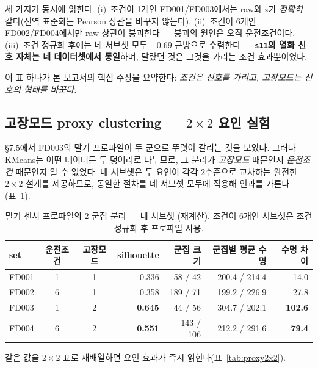 \documentclass[11pt]{article}
\begin{document}
세 가지가 동시에 읽힌다.
(i)~조건이 1개인 FD001/FD003에서는 raw와 z가 \emph{정확히} 같다(전역 표준화는 Pearson 상관을 바꾸지 않는다).
(ii)~조건이 6개인 FD002/FD004에서만 raw 상관이 붕괴한다 — 붕괴의 원인은 오직 운전조건이다.
(iii)~조건 정규화 후에는 네 서브셋 모두 $-0.69$ 근방으로 수렴한다 — \textbf{\texttt{s11}의 열화 신호 자체는 네 데이터셋에서 동일}하며, 달랐던 것은 그것을 가리는 조건 효과뿐이었다.

이 표 하나가 본 보고서의 핵심 주장을 요약한다: \emph{조건은 신호를 가리고, 고장모드는 신호의 형태를 바꾼다.}

\subsection{고장모드 proxy clustering — $2\times2$ 요인 실험}
\label{sec:proxy}

\S7.5에서 FD003의 말기 프로파일이 두 군으로 뚜렷이 갈리는 것을 보았다.
그러나 KMeans는 어떤 데이터든 두 덩어리로 나누므로, 그 분리가 \emph{고장모드} 때문인지 \emph{운전조건} 때문인지 알 수 없었다.
네 서브셋은 두 요인이 각각 2수준으로 교차하는 완전한 $2\times2$ 설계를 제공하므로, 동일한 절차를 네 서브셋 모두에 적용해 인과를 가른다(표~\ref{tab:proxy}).

\begin{table}[H]
\centering
\caption{말기 센서 프로파일의 2-군집 분리 — 네 서브셋 (재계산). 조건이 6개인 서브셋은 조건 정규화 후 프로파일 사용.}
\label{tab:proxy}
\begin{tabular}{lccrrrr}
\toprule
set & 운전조건 & 고장모드 & silhouette & 군집 크기 & 군집별 평균 수명 & 수명 차이 \\
\midrule
FD001 & 1 & 1 & 0.336 & 58 / 42 & 200.4 / 214.4 & 14.0 \\
FD002 & 6 & 1 & 0.358 & 189 / 71 & 199.2 / 226.9 & 27.8 \\
FD003 & 1 & 2 & \textbf{0.645} & 44 / 56 & 304.7 / 202.1 & \textbf{102.6} \\
FD004 & 6 & 2 & \textbf{0.551} & 143 / 106 & 212.2 / 291.6 & \textbf{79.4} \\
\bottomrule
\end{tabular}
\end{table}

같은 값을 $2\times2$ 표로 재배열하면 요인 효과가 즉시 읽힌다(표~\ref{tab:proxy2x2}).
\end{document}

